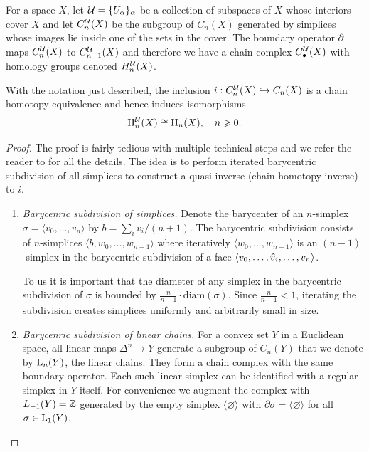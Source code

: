 For a space $X$, let $\mathcal{U}=\{U_\alpha\}_\alpha$ be a collection of subspaces of $X$ whose interiors cover $X$ and let $C_n^{\mathcal{U}}(X)$ be the subgroup of $C_n(X)$ generated by simplices whose images lie inside one of the sets in the cover. The boundary operator $\partial$ maps $C^{\mathcal{U}}_n(X)$ to $C^{\mathcal{U}}_{n-1}(X)$ and therefore we have a chain complex $C_\bullet^{\mathcal{U}}(X)$ with homology groups denoted $H^{\mathcal{U}}_n(X)$.


\begin{prop}\label{thm 2.21 Hatcher}
    With the notation just described, the inclusion $i:C_n^{\mathcal{U}}(X)\hookrightarrow C_n(X)$ is a chain homotopy equivalence and hence induces isomorphisms
    \[\mathrm{H}_n^{\mathcal{U}}(X)\cong \mathrm{H}_n(X),\quad n\geqslant 0.\]
\end{prop}
\begin{proof}
     The proof is fairly tedious with multiple technical steps and we refer the reader to \cite[Thm. 2.21]{Hatcher} for all the details. The idea is to perform iterated barycentric subdivision of all simplices to construct a quasi-inverse (chain homotopy inverse) to $i$. 
     
     \begin{enumerate}
         \item \emph{Barycenric subdivision of simplices.} Denote the barycenter of an $n$-simplex $\sigma=\langle v_0,\ldots,v_n\rangle$ by  $b=\sum_i v_i/(n+1)$. The barycentric subdivision consists of $n$-simplices $\langle b,w_0,\ldots,w_{n-1}
         \rangle$ where iteratively $\langle w_0,\ldots,w_{n-1}\rangle$ is an $(n-1)$-simplex in the barycentric subdivision of a face $\langle v_0,\ldots,\wh{v}_i,\ldots,v_n\rangle$.
         
         To us it is important that the diameter of any simplex in the barycentric subdivision of $\sigma$ is bounded by $\frac{n}{n+1}\cdot \text{diam}(\sigma)$. Since $\frac{n}{n+1}<1$, iterating the subdivision creates simplices uniformly and arbitrarily small in size.
         
         \item \emph{Barycenric subdivision of linear chains.} For a convex set $Y$ in a Euclidean space, all linear maps $\Delta^n\to Y$ generate a subgroup of $C_n(Y)$ that we denote by $\mathrm{L}_n(Y)$, the linear chains. They form a chain complex with the same boundary operator. Each such linear simplex can be identified with a regular simplex in $Y$ itself.  For convenience we augment the complex with $L_{-1}(Y)=\mathbb{Z}$ generated by the empty simplex $\langle \varnothing \rangle$ with $\partial \sigma=\langle \varnothing \rangle$ for all $\sigma\in \mathrm{L}_1(Y)$.
         

\end{enumerate}
\end{proof}
